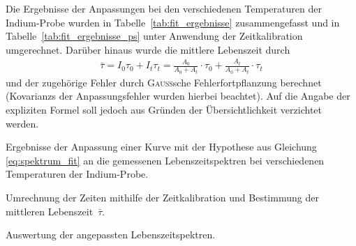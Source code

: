 \documentclass[11pt, a4paper]{article}
\numberwithin{equation}{section}
\begin{document}
Die Ergebnisse der Anpassungen bei den verschiedenen Temperaturen der Indium-Probe wurden in Tabelle~\ref{tab:fit_ergebnisse} zusammengefasst und in Tabelle~\ref{tab:fit_ergebnisse_ps} unter Anwendung der Zeitkalibration umgerechnet.
Darüber hinaus wurde die mittlere Lebenszeit durch
\begin{align*}
	\bar{\tau} = I_0 \tau_0 + I_t \tau_t = \frac{A_0}{A_0 + A_t} \cdot \tau_0 + \frac{A_t}{A_0 + A_t} \cdot \tau_t
\end{align*}
\cite{add_infos} und der zugehörige Fehler durch \textsc{Gauß}sche Fehlerfortpflanzung berechnet (Kovarianzs der Anpassungsfehler wurden hierbei beachtet).
Auf die Angabe der expliziten Formel soll jedoch aus Gründen der Übersichtlichkeit verzichtet werden.
\begin{table}
	\begin{subtable}{\textwidth}
		\centering
		\resizebox{\textwidth}{!}{
			
		}
		\caption{Ergebnisse der Anpassung einer Kurve mit der Hypothese aus Gleichung \eqref{eq:spektrum_fit} an die gemessenen Lebenszeitspektren bei verschiedenen Temperaturen der Indium-Probe.}
		\label{tab:fit_ergebnisse}
		\vspace*{0.8cm}
	\end{subtable}
	\begin{subtable}{\textwidth}
		\centering
		
		\caption{Umrechnung der Zeiten mithilfe der Zeitkalibration und Bestimmung der mittleren Lebenszeit~$\bar{\tau}$.}
		\label{tab:fit_ergebnisse_ps}
		\vspace*{0.5cm}
	\end{subtable}
	\caption{Auswertung der angepassten Lebenszeitspektren.}
\end{table}
\end{document}
